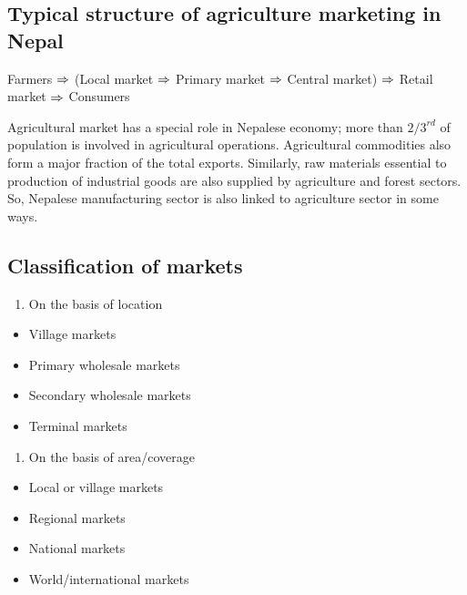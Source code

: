 \documentclass[11pt,]{book}
\providecommand{\tightlist}{%
  \setlength{\itemsep}{0pt}\setlength{\parskip}{0pt}}
\theoremstyle{definition}
\theoremstyle{definition}
\theoremstyle{definition}
\theoremstyle{remark}
\begin{document}
\subsection{Typical structure of agriculture marketing in
Nepal}\label{typical-structure-of-agriculture-marketing-in-nepal}

Farmers \(\LARGE{\Rightarrow}\) (Local market \(\LARGE{\Rightarrow}\)
Primary market \(\LARGE{\Rightarrow}\) Central market)
\(\LARGE{\Rightarrow}\) Retail market \(\LARGE{\Rightarrow}\) Consumers

Agricultural market has a special role in Nepalese economy; more than
\(2/3^{rd}\) of population is involved in agricultural operations.
Agricultural commodities also form a major fraction of the total
exports. Similarly, raw materials essential to production of industrial
goods are also supplied by agriculture and forest sectors. So, Nepalese
manufacturing sector is also linked to agriculture sector in some ways.

\subsection{Classification of markets}\label{classification-of-markets}

\begin{enumerate}
\def\labelenumi{\arabic{enumi}.}
\tightlist
\item
  On the basis of location
\end{enumerate}

\begin{itemize}
\tightlist
\item
  Village markets
\item
  Primary wholesale markets
\item
  Secondary wholesale markets
\item
  Terminal markets
\end{itemize}

\begin{enumerate}
\def\labelenumi{\arabic{enumi}.}
\setcounter{enumi}{1}
\tightlist
\item
  On the basis of area/coverage
\end{enumerate}

\begin{itemize}
\tightlist
\item
  Local or village markets
\item
  Regional markets
\item
  National markets
\item
  World/international markets
\end{itemize}
\end{document}
